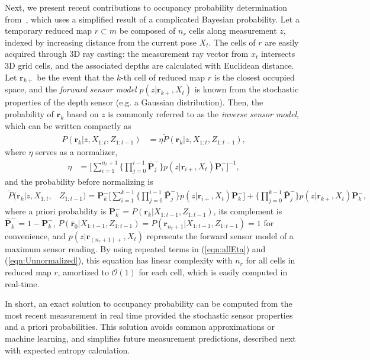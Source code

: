 \documentclass[conf]{new-aiaa}
\newcommand{\refeqn}[1]{(\ref{eqn:#1})}
\begin{document}
Next, we present recent contributions to occupancy probability determination from~\cite{KauLeeAiMos16,KauTakAiLee17}, which uses a simplified result of a complicated Bayesian probability. Let a temporary reduced map $r\subset m$ be composed of $n_r$ cells along measurement $z$, indexed by increasing distance from the current pose $X_t$. The cells of $r$ are easily acquired through 3D ray casting: the measurement ray vector from $x_t$ intersects 3D grid cells, and the associated depths are calculated with Euclidean distance. Let $\mathbf{r}_{k+}$ be the event that the $k$-th cell of reduced map $r$ is the closest occupied space, and the \emph{forward sensor model} $p(z|\mathbf{r}_{k+},X_t)$ is known from the stochastic properties of the depth sensor (e.g. a Gaussian distribution). Then, the probability of $\mathbf{r}_k$ based on $z$ is commonly referred to as the \emph{inverse sensor model}, which can be written compactly as
\begin{align}
\label{eqn:RayISMAnswer}
P(\mathbf{r}_{k}|z,X_{1:t},Z_{1:t-1})&=\eta\tilde P(\mathbf{r}_{k}|z,X_{1:t},Z_{1:t-1}),
\end{align}
where $\eta$ serves as a normalizer,
\begin{align}
\label{eqn:allEta}
\eta
&=
\bigg[\sum_{i=1}^{n_{r}+1}\bigg\{\prod_{j=0}^{i-1}\bar{\mathbf{P}}_j^-\bigg\} p(z|\mathbf{r}_{i+},X_t)\mathbf{P}_i^-\bigg]^{-1},
\end{align}
and the probability before normalizing is
\begin{align}
\label{eqn:Unnormalized}
\tilde P(\mathbf{r}_{k}|z,X_{1:t},&Z_{1:t-1})=\mathbf{P}_k^-
\bigg[\sum_{i=1}^{k-1}\bigg\{\prod_{j=0}^{i-1}\bar{\mathbf{P}}_j^-\bigg\}p(z|\mathbf{r}_{i+},X_t)\mathbf{P}_k^-\bigg]
+ \bigg\{\prod_{j=0}^{k-1}\bar{\mathbf{P}}_j^-\bigg\}p(z|\mathbf{r}_{k+},X_t)\mathbf{P}_k^-,
\end{align}
where a priori probability is $\mathbf{P}_k^-=P(\mathbf{r}_{k}|X_{1:t-1},Z_{1:t-1})$, its complement is $\bar{\mathbf{P}}_k^-=1-\mathbf{P}_k^-$, $P(\bar{\mathbf{r}}_{0}|X_{1:t-1},Z_{1:t-1})=P(\mathbf{r}_{n_r+1}|X_{1:t-1},Z_{1:t-1})=1$ for convenience, and $p(z|\mathbf{r}_{(n_r+1)+},X_t)$ represents the forward sensor model of a maximum sensor reading. By using repeated terms in \refeqn{allEta} and \refeqn{Unnormalized}, this equation has linear complexity with $n_r$ for all cells in reduced map $r$, amortized to $\mathcal{O}(1)$ for each cell, which is easily computed in real-time.

In short, an exact solution to occupancy probability can be computed from the most recent measurement in real time provided the stochastic sensor properties and a priori probabilities. This solution avoids common approximations or machine learning, and simplifies future measurement predictions, described next with expected entropy calculation.
\end{document}
